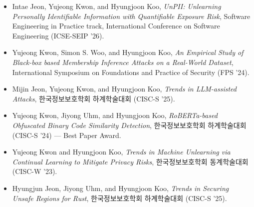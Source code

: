 \begin{sloppypar}
\begin{itemize}[leftmargin=*]
    \item Intae Jeon, Yujeong Kwon, and Hyungjoon Koo, \emph{UnPII: Unlearning Personally Identifiable Information with Quantifiable Exposure Risk}, Software Engineering in Practice track, International Conference on Software Engineering (ICSE-SEIP '26).
    \item Yujeong Kwon, Simon S. Woo, and Hyungjoon Koo, \emph{An Empirical Study of Black-box based Membership Inference Attacks on a Real-World Dataset}, International Symposium on Foundations and Practice of Security (FPS '24).
    \item Mijin Jeon, Yujeong Kwon, and Hyungjoon Koo, \emph{Trends in LLM-assisted Attacks}, 한국정보보호학회 하계학술대회 (CISC-S '25).
    \item Yujeong Kwon, Jiyong Uhm, and Hyungjoon Koo, \emph{RoBERTa-based Obfuscated Binary Code Similarity Detection}, 한국정보보호학회 하계학술대회 (CISC-S '24) --- Best Paper Award.
    \item Yujeong Kwon and Hyungjoon Koo, \emph{Trends in Machine Unlearning via Continual Learning to Mitigate Privacy Risks}, 한국정보보호학회 동계학술대회 (CISC-W '23).

    \item Hyungjun Jeon, Jiyong Uhm, and Hyungjoon Koo, \emph{Trends in Securing Unsafe Regions for Rust}, 한국정보보호학회 하계학술대회 (CISC-S '25).
\end{itemize}
\end{sloppypar}

